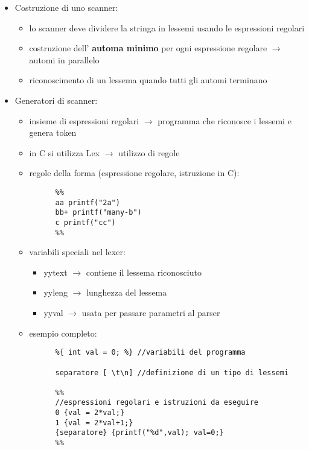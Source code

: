 \documentclass[12pt]{extarticle}
\begin{document}
\begin{itemize}
\begin{itemize}
\begin{itemize}
    \end{itemize}
  \end{itemize}
  \item Costruzione di uno scanner:
   \begin{itemize}
    \item lo scanner deve dividere la stringa in lessemi usando le espressioni regolari
    \item costruzione dell' \textbf{automa minimo} per ogni espressione regolare $\rightarrow$ automi in parallelo
    \item riconoscimento di un lessema quando tutti gli automi terminano
   \end{itemize}
  \item Generatori di scanner:
  \begin{itemize}
    \item insieme di espressioni regolari $\rightarrow$ programma che riconosce i lessemi e genera token
    \item in C si utilizza Lex $\rightarrow$ utilizzo di regole 
    \item regole della forma (espressione regolare, istruzione in C):
    \begin{lstlisting}
      %%
      aa printf("2a")
      bb+ printf("many-b")
      c printf("cc")
      %%
    \end{lstlisting}
    \item variabili speciali nel lexer:
    \begin{itemize}
      \item yytext $\rightarrow$ contiene il lessema riconosciuto
      \item yyleng $\rightarrow$ lunghezza del lessema
      \item yyval $\rightarrow$ usata per passare parametri al parser
    \end{itemize}
    \item esempio completo:
    \begin{lstlisting}
      %{ int val = 0; %} //variabili del programma
      
      separatore [ \t\n] //definizione di un tipo di lessemi
      
      %%
      //espressioni regolari e istruzioni da eseguire
      0 {val = 2*val;}
      1 {val = 2*val+1;}
      {separatore} {printf("%d",val); val=0;}
      %%
  \end{lstlisting}
  \end{itemize}
\end{itemize}
\end{document}
